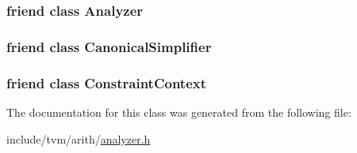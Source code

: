 \subsubsection[{\texorpdfstring{Analyzer}{Analyzer}}]{\setlength{\rightskip}{0pt plus 5cm}friend class {\bf Analyzer}\hspace{0.3cm}{\ttfamily [friend]}}\hypertarget{classtvm_1_1arith_1_1RewriteSimplifier_a88d594816df596eed10643082b0d0805}{}\label{classtvm_1_1arith_1_1RewriteSimplifier_a88d594816df596eed10643082b0d0805}
\subsubsection[{\texorpdfstring{Canonical\+Simplifier}{CanonicalSimplifier}}]{\setlength{\rightskip}{0pt plus 5cm}friend class {\bf Canonical\+Simplifier}\hspace{0.3cm}{\ttfamily [friend]}}\hypertarget{classtvm_1_1arith_1_1RewriteSimplifier_abd092d074e3063da6d7bb0c67115a33f}{}\label{classtvm_1_1arith_1_1RewriteSimplifier_abd092d074e3063da6d7bb0c67115a33f}
\subsubsection[{\texorpdfstring{Constraint\+Context}{ConstraintContext}}]{\setlength{\rightskip}{0pt plus 5cm}friend class {\bf Constraint\+Context}\hspace{0.3cm}{\ttfamily [friend]}}\hypertarget{classtvm_1_1arith_1_1RewriteSimplifier_ab8bf22547cf1df0a28fc4ee98841ab89}{}\label{classtvm_1_1arith_1_1RewriteSimplifier_ab8bf22547cf1df0a28fc4ee98841ab89}


The documentation for this class was generated from the following file\+:\begin{DoxyCompactItemize}
\item 
include/tvm/arith/\hyperlink{analyzer_8h}{analyzer.\+h}\end{DoxyCompactItemize}
